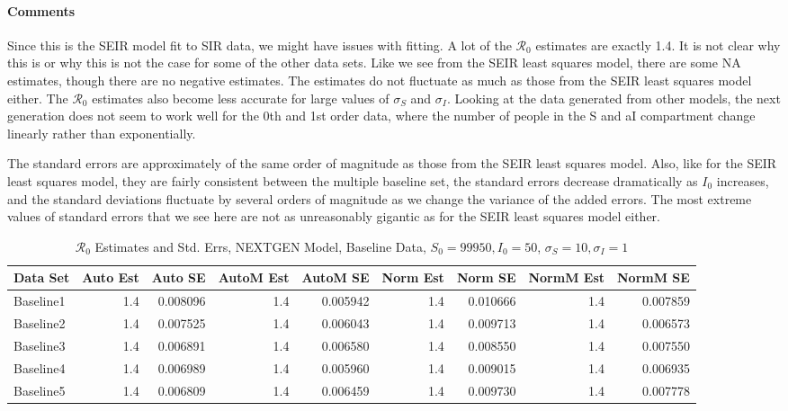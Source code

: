 \documentclass[12pt]{article}
\newcommand{\rr}{\ensuremath{\mathcal{R}_0}}
\begin{document}
\paragraph{Comments}

Since this is the SEIR model fit to SIR data, we might have issues with fitting. A lot of the $\rr$ estimates are exactly 1.4. It is not clear why this is or why this is not the case for some of the other data sets. Like we see from the SEIR least squares model, there are some NA estimates, though there are no negative estimates. The estimates do not fluctuate as much as those from the SEIR least squares model either. The $\rr$ estimates also become less accurate for large values of $\sigma_S$ and $\sigma_I$. Looking at the data generated from other models, the next generation does not seem to work well for the 0th and 1st order data, where the number of people in the S and aI compartment change linearly rather than exponentially.

The standard errors are approximately of the same order of magnitude as those from the SEIR least squares model. Also, like for the SEIR least squares model, they are fairly consistent between the multiple baseline set, the standard errors decrease dramatically as $I_0$ increases, and the standard deviations fluctuate by several orders of magnitude as we change the variance of the added errors. The most extreme values of standard errors that we see here are not as unreasonably gigantic as for the SEIR least squares model either.

\begin{table}[H]
	
	\caption{$\rr$ Estimates and Std. Errs, NEXTGEN Model, 
		Baseline Data, $S_0 = 99950, I_0 = 50$, 
		$\sigma_S = 10, \sigma_I = 1$}
	\begin{footnotesize}
		\hskip -1cm
	\begin{tabular}{l|r|r|r|r|r|r|r|r}
		\hline
		Data Set & Auto Est & Auto SE & AutoM Est & AutoM SE & Norm Est & Norm SE & NormM Est & NormM SE\\
		\hline
		Baseline1 & 1.4 & 0.008096 & 1.4 & 0.005942 & 1.4 & 0.010666 & 1.4 & 0.007859\\
		\hline
		Baseline2 & 1.4 & 0.007525 & 1.4 & 0.006043 & 1.4 & 0.009713 & 1.4 & 0.006573\\
		\hline
		Baseline3 & 1.4 & 0.006891 & 1.4 & 0.006580 & 1.4 & 0.008550 & 1.4 & 0.007550\\
		\hline
		Baseline4 & 1.4 & 0.006989 & 1.4 & 0.005960 & 1.4 & 0.009015 & 1.4 & 0.006935\\
		\hline
		Baseline5 & 1.4 & 0.006809 & 1.4 & 0.006459 & 1.4 & 0.009730 & 1.4 & 0.007778\\
		\hline
	\end{tabular}
\end{footnotesize}
\end{table}
\end{document}
